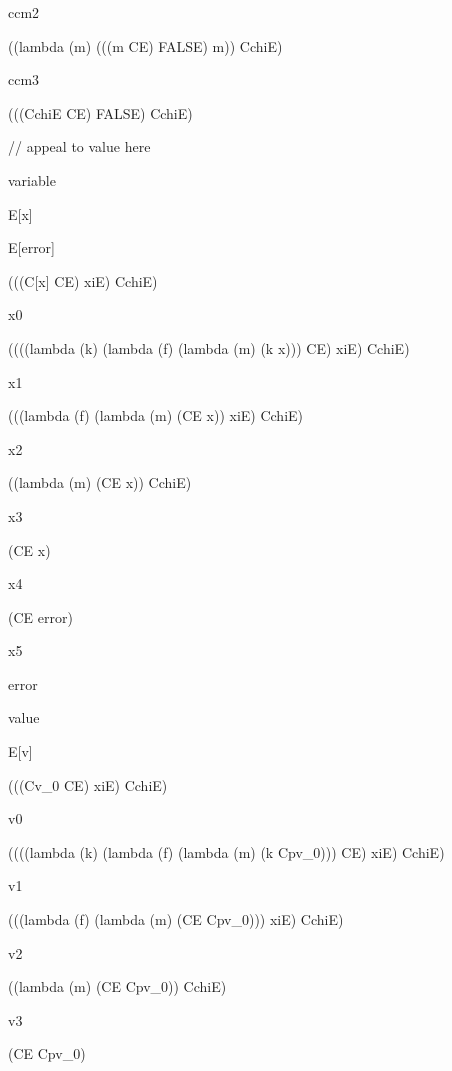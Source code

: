 \documentclass[ms,electronic,twosidetoc,letterpaper,chaptercenter,parttop]{byumsphd}
\begin{document}
\begin{singlespace}
ccm2
\begin{schemedisplay}
((lambda (m)
   (((m CE) FALSE) m))
 CchiE)
\end{schemedisplay}

ccm3
\begin{schemedisplay}
(((CchiE CE) FALSE) CchiE)
\end{schemedisplay}

// appeal to value here

variable
\begin{schemedisplay}
E[x]
\end{schemedisplay}

\begin{schemedisplay}
E[error]
\end{schemedisplay}

\begin{schemedisplay}
(((C[x] CE) xiE) CchiE)
\end{schemedisplay}

x0
\begin{schemedisplay}
((((lambda (k) (lambda (f) (lambda (m) (k x))) CE) xiE) CchiE)
\end{schemedisplay}

x1
\begin{schemedisplay}
(((lambda (f) (lambda (m) (CE x)) xiE) CchiE)
\end{schemedisplay}

x2
\begin{schemedisplay}
((lambda (m) (CE x)) CchiE)
\end{schemedisplay}

x3
\begin{schemedisplay}
(CE x)
\end{schemedisplay}

x4
\begin{schemedisplay}
(CE error)
\end{schemedisplay}

x5
\begin{schemedisplay}
error
\end{schemedisplay}

value
\begin{schemedisplay}
E[v]
\end{schemedisplay}

\begin{schemedisplay}
(((Cv_0 CE) xiE) CchiE)
\end{schemedisplay}

v0
\begin{schemedisplay}
((((lambda (k) (lambda (f) (lambda (m) (k Cpv_0))) CE) xiE) CchiE)
\end{schemedisplay}

v1
\begin{schemedisplay}
(((lambda (f) (lambda (m) (CE Cpv_0))) xiE) CchiE)
\end{schemedisplay}

v2
\begin{schemedisplay}
((lambda (m) (CE Cpv_0)) CchiE)
\end{schemedisplay}

v3
\begin{schemedisplay}
(CE Cpv_0)
\end{schemedisplay}
\end{singlespace}
\end{document}
